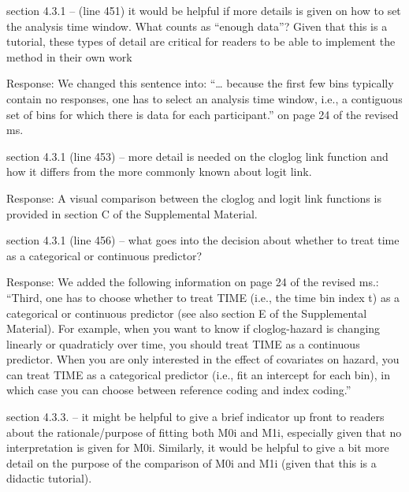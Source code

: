 \documentclass[
]{article}
\renewenvironment{quote}{\begin{leftbar}}{\end{leftbar}}
\begin{document}
\begin{quote}
section 4.3.1 -- (line 451) it would be helpful if more details is given
on how to set the analysis time window. What counts as ``enough data''?
Given that this is a tutorial, these types of detail are critical for
readers to be able to implement the method in their own work
\end{quote}

Response: We changed this sentence into: ``\ldots{} because the first
few bins typically contain no responses, one has to select an analysis
time window, i.e., a contiguous set of bins for which there is data for
each participant.'' on page 24 of the revised ms.

\begin{quote}
section 4.3.1 (line 453) -- more detail is needed on the cloglog link
function and how it differs from the more commonly known about logit
link.
\end{quote}

Response: A visual comparison between the cloglog and logit link
functions is provided in section C of the Supplemental Material.

\begin{quote}
section 4.3.1 (line 456) -- what goes into the decision about whether to
treat time as a categorical or continuous predictor?
\end{quote}

Response: We added the following information on page 24 of the revised
ms.: ``Third, one has to choose whether to treat TIME (i.e., the time
bin index t) as a categorical or continuous predictor (see also section
E of the Supplemental Material). For example, when you want to know if
cloglog-hazard is changing linearly or quadraticly over time, you should
treat TIME as a continuous predictor. When you are only interested in
the effect of covariates on hazard, you can treat TIME as a categorical
predictor (i.e., fit an intercept for each bin), in which case you can
choose between reference coding and index coding.''

\begin{quote}
section 4.3.3. -- it might be helpful to give a brief indicator up front
to readers about the rationale/purpose of fitting both M0i and M1i,
especially given that no interpretation is given for M0i. Similarly, it
would be helpful to give a bit more detail on the purpose of the
comparison of M0i and M1i (given that this is a didactic tutorial).
\end{quote}
\end{document}
